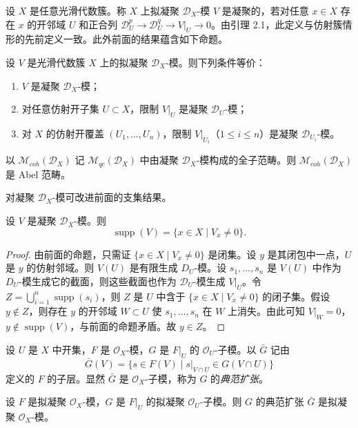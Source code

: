 设 $X$ 是任意光滑代数簇。称 $X$ 上拟凝聚 $\mathcal{D}_X$-模 $V$ 是凝聚的，若对任意 $x\in X$ 存在 $x$ 的开邻域 $U$ 和正合列 $\mathcal{D}_U^p\to\mathcal{D}_U^q\to V|_U\to 0$。由引理 2.1，此定义与仿射簇情形的先前定义一致。此外前面的结果蕴含如下命题。

\begin{proposition}
设 $V$ 是光滑代数簇 $X$ 上的拟凝聚 $\mathcal{D}_X$-模。则下列条件等价：
\begin{enumerate}[label=(\roman*)]
  \item $V$ 是凝聚 $\mathcal{D}_X$-模；
  \item 对任意仿射开子集 $U\subset X$，限制 $V|_U$ 是凝聚 $\mathcal{D}_U$-模；
  \item 对 $X$ 的仿射开覆盖 $(U_1,\dots,U_n)$，限制 $V|_{U_i}$（$1\le i\le n$）是凝聚 $\mathcal{D}_{U_i}$-模。
\end{enumerate}
\end{proposition}

以 $\mathcal{M}_{coh}(\mathcal{D}_X)$ 记 $\mathcal{M}_{qc}(\mathcal{D}_X)$ 中由凝聚 $\mathcal{D}_X$-模构成的全子范畴。则 $\mathcal{M}_{coh}(\mathcal{D}_X)$ 是 Abel 范畴。

对凝聚 $\mathcal{D}_X$-模可改进前面的支集结果。

\begin{proposition}
设 $V$ 是凝聚 $\mathcal{D}_X$-模。则
$$\operatorname{supp}(V)=\{x\in X\mid V_x\neq 0\}.$$
\end{proposition}

\begin{proof}
由前面的命题，只需证 $\{x\in X\mid V_x\neq 0\}$ 是闭集。设 $y$ 是其闭包中一点，$U$ 是 $y$ 的仿射邻域。则 $V(U)$ 是有限生成 $D_U$-模。设 $s_1,\dots,s_n$ 是 $V(U)$ 中作为 $D_U$-模生成它的截面，则这些截面也作为 $\mathcal{D}_U$-模生成 $V|_U$。令 $Z=\bigcup_{i=1}^n\operatorname{supp}(s_i)$，则 $Z$ 是 $U$ 中含于 $\{x\in X\mid V_x\neq 0\}$ 的闭子集。假设 $y\notin Z$，则存在 $y$ 的开邻域 $W\subset U$ 使 $s_1,\dots,s_n$ 在 $W$ 上消失。由此可知 $V|_W=0$，$y\notin\operatorname{supp}(V)$，与前面的命题矛盾。故 $y\in Z$。
\end{proof}

设 $U$ 是 $X$ 中开集，$F$ 是 $\mathcal{O}_X$-模，$G$ 是 $F|_U$ 的 $\mathcal{O}_U$-子模。以 $\bar G$ 记由
$$\bar G(V)=\{s\in F(V)\mid s|_{V\cap U}\in G(V\cap U)\}$$
定义的 $F$ 的子层。显然 $\bar G$ 是 $\mathcal{O}_X$-子模，称为 $G$ 的\emph{典范扩张}。

\begin{lemma}
设 $F$ 是拟凝聚 $\mathcal{O}_X$-模，$G$ 是 $F|_U$ 的拟凝聚 $\mathcal{O}_U$-子模。则 $G$ 的典范扩张 $\bar G$ 是拟凝聚 $\mathcal{O}_X$-模。
\end{lemma}

